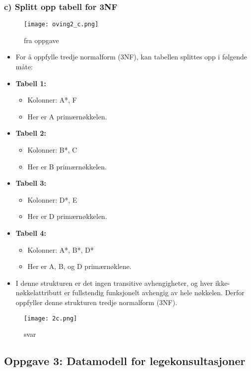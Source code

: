 \documentclass{article}
\begin{document}
\subsubsection*{c) Splitt opp tabell for 3NF}
\begin{figure}[H]
    \centering
    \texttt{[image: oving2\_c.png]}
    \caption{fra oppgave}
    \label{fig:example}
\end{figure}
\begin{itemize}
    \item For å oppfylle tredje normalform (3NF), kan tabellen splittes opp i følgende måte:
    \item \textbf{Tabell 1:}
    \begin{itemize}
        \item Kolonner: A*, F
        \item Her er A primærnøkkelen.
    \end{itemize}
    \item \textbf{Tabell 2:}
    \begin{itemize}
        \item Kolonner: B*, C
        \item Her er B primærnøkkelen.
    \end{itemize}
    \item \textbf{Tabell 3:}
    \begin{itemize}
        \item Kolonner: D*, E
        \item Her er D primærnøkkelen.
    \end{itemize}
    \item \textbf{Tabell 4:}
    \begin{itemize}
        \item Kolonner: A*, B*, D*
        \item Her er A, B, og D primærnøklene.
    \end{itemize}
    \item I denne strukturen er det ingen transitive avhengigheter, og hver ikke-nøkkelattributt er fullstendig funksjonelt avhengig av hele nøkkelen. Derfor oppfyller denne strukturen tredje normalform (3NF).
\end{itemize}
\begin{figure}[H]
    \centering
    \texttt{[image: 2c.png]}
    \caption{svar}
    \label{fig:example}
\end{figure}

\subsection*{Oppgave 3: Datamodell for legekonsultasjoner}
\end{document}
